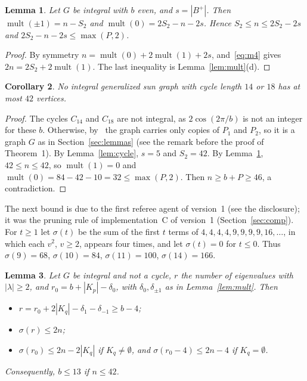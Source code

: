 \documentclass[11pt]{article}
\newtheorem{lemma}{Lemma}[section]
\newtheorem{corollary}[lemma]{Corollary}
\theoremstyle{definition}
\theoremstyle{remark}
\DeclareMathOperator{\mult}{mult}
\begin{document}
\begin{lemma}\label{lem:count}
Let $G$ be integral with $b$ even, and $s=|B^+|$. Then
$\mult(\pm1)=n-S_2$ and $\mult(0)=2S_2-n-2s$. Hence $S_2\le n\le2S_2-2s$ and
$2S_2-n-2s\le\max(P,2)$.
\end{lemma}

\begin{proof}
By symmetry $n=\mult(0)+2\mult(1)+2s$, and~\eqref{eq:m4} gives
$2n=2S_2+2\mult(1)$. The last inequality is Lemma~\ref{lem:mult}(d).
\end{proof}

\begin{corollary}\label{cor:1418}
No integral generalized sun graph with cycle length $14$ or $18$ has at most
$42$ vertices.
\end{corollary}


\begin{proof}
The cycles $C_{14}$ and $C_{18}$ are not integral, as $2\cos(2\pi/b)$ is not an
integer for these $b$. Otherwise, by~\cite[Theorem~2.1]{bms} the graph carries
only copies of $P_1$ and $P_2$, so it is a graph $G$ as in
Section~\ref{sec:lemmas} (see the remark before the proof of Theorem~1). By Lemma~\ref{lem:cycle}, $s=5$ and $S_2=42$. By
Lemma~\ref{lem:count}, $42\le n\le42$, so $\mult(1)=0$ and
$\mult(0)=84-42-10=32\le\max(P,2)$. Then $n\ge b+P\ge46$, a contradiction.
\end{proof}

The next bound is due to the first referee agent of version~1 (see the
disclosure); it was the pruning rule of implementation~C of version~1
(Section~\ref{sec:comp}). For $t\ge1$ let
$\sigma(t)$ be the sum of the first $t$ terms of $4,4,4,4,9,9,9,9,16,\dots$, in
which each $v^2$, $v\ge2$, appears four times, and let $\sigma(t)=0$ for
$t\le0$. Thus $\sigma(9)=68$, $\sigma(10)=84$, $\sigma(11)=100$, $\sigma(14)=166$.

\begin{lemma}\label{lem:rank}
Let $G$ be integral and not a cycle, $r$ the number of eigenvalues with
$|\lambda|\ge2$, and $r_0=b+|K_p|-\delta_0$, with $\delta_0,\delta_{\pm1}$ as in
Lemma~\ref{lem:mult}. Then
\begin{itemize}
\item[(a)] $r=r_0+2|K_q|-\delta_1-\delta_{-1}\ge b-4$;
\item[(b)] $\sigma(r)\le2n$;
\item[(c)] $\sigma(r_0)\le2n-2|K_q|$ if $K_q\ne\emptyset$, and
 $\sigma(r_0-4)\le2n-4$ if $K_q=\emptyset$.
\end{itemize}
Consequently, $b\le13$ if $n\le42$.
\end{lemma}
\end{document}
